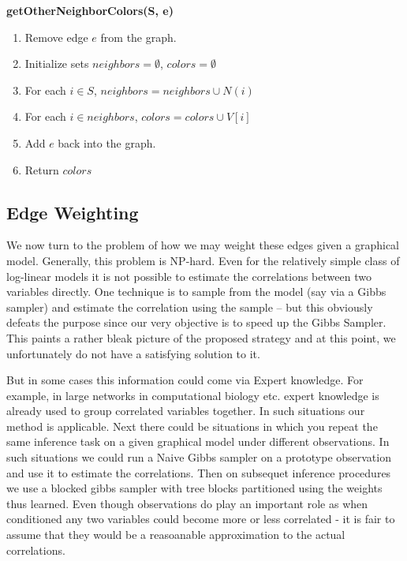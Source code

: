 \documentclass{article} %
\begin{document}
\begin{framed}
\noindent\textbf{getOtherNeighborColors(S, e)}
\begin{enumerate}
\item Remove edge $e$ from the graph.
\item Initialize sets $neighbors=\emptyset$, $colors=\emptyset$
\item For each $i\in S$, $neighbors=neighbors\cup N(i)$
\item For each $i\in neighbors$, $colors=colors\cup V[i]$
\item Add $e$ back into the graph.
\item Return $colors$
\end{enumerate}
\end{framed}


\subsection{Edge Weighting}
\label{sec:edgeweighting}

We now turn to the problem of how we may weight these edges given a graphical
model. Generally, this problem is NP-hard. Even for the relatively simple class
of log-linear models it is not possible to estimate the correlations between two
variables directly. One technique is to sample from the model (say via a Gibbs
sampler) and estimate the correlation using the sample -- but this obviously
defeats the purpose since our very objective is to speed up the Gibbs Sampler.
This paints a rather bleak picture of the proposed strategy and at this point,
we unfortunately do not have a satisfying solution to it.

But in some cases this information could come via Expert knowledge. For example,
in large networks in computational biology etc. expert knowledge is already used
to group correlated variables together. In such situations our method is
applicable. Next there could be situations in which you repeat the same
inference task on a given graphical model under different observations. In such
situations we could run a Naive Gibbs sampler on a prototype observation and use
it to estimate the correlations. Then on subsequet inference procedures we use a
blocked gibbs sampler with tree blocks partitioned using the weights thus
learned. Even though observations do play an important role as when conditioned
any two variables could become more or less correlated - it is fair to assume
that they would be a reasoanable approximation to the actual correlations.


\end{document}
